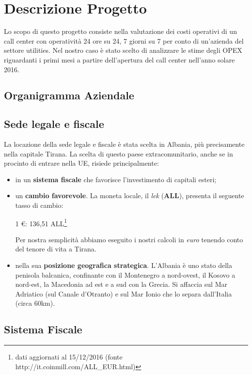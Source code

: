 \chapter*{Descrizione Progetto}
\renewcommand{\thesection}{\arabic{section}}
Lo scopo di questo progetto consiste nella valutazione dei costi operativi di un call center con operatività 24 ore su 24, 7 giorni su 7 per conto di un'azienda del settore utilities.
Nel nostro caso è stato scelto di analizzare le stime degli \ac{OPEX} riguardanti i primi mesi a partire dell'apertura del call center nell'anno solare 2016.
\section[Organigramma Aziendale]{Organigramma Aziendale}

\section[Sede legale e fiscale]{Sede legale e fiscale}
La locazione della sede legale e fiscale è stata scelta in Albania, più precisamente nella capitale Tirana.
La scelta di questo paese extracomunitario, anche se in procinto di entrare nella \ac{UE}\cite{entrataAlbaniaUE}, risiede principalmente:
\begin{itemize}
	\item in un \textbf{sistema fiscale} che favorisce l'investimento di capitali esteri;
	\item un \textbf{cambio favorevole}. La moneta locale, il \textit{lek} (\textbf{ALL}), presenta il seguente tasso di cambio:
	\begin{center}
		1 \euro : 136,51 ALL\footnote{dati aggiornati al 15/12/2016 (fonte http://it.coinmill.com/ALL\_EUR.html)}
	\end{center}
	Per nostra semplicità abbiamo eseguito i nostri calcoli in \textit{euro} tenendo conto del tenore di vita a Tirana.
	\item nella sua \textbf{posizione geografica strategica}. L'Albania è uno stato della penisola balcanica, confinante con il Montenegro a nord-ovest, il Kosovo a nord-est, la Macedonia ad est e a sud con la Grecia. Si affaccia sul Mar Adriatico (sul Canale d'Otranto) e sul Mar Ionio che lo separa dall'Italia (circa 60km).
\end{itemize} 
\section[Sistema Fiscale]{Sistema Fiscale}
  
